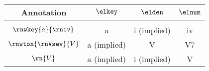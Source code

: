 \begin{tabular}{c|ccc}
Annotation & $\elkey$       & $\elden$       & $\elnum$ \\
\hline \\
$\rnwkey{a}{\rniv}$         & a              & i (implied)       & iv       \\
$\rnwton{\rnVsev}{V}$       & a (implied)    & V                 & V7       \\
$\rn{V}$                    & a (implied)    & i (implied)       & V    
\end{tabular}
